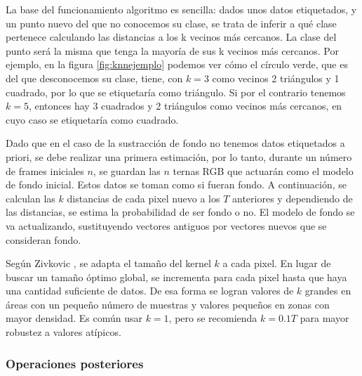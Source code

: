 La base del funcionamiento algoritmo es sencilla: dados unos datos etiquetados, y un punto nuevo del que no conocemos su clase, se trata de inferir a qué clase pertenece calculando las distancias a los k vecinos más cercanos. La clase del punto será la misma que tenga la mayoría de sus k vecinos más cercanos. Por ejemplo, en la figura \ref{fig:knnejemplo} podemos ver cómo el círculo verde, que es del que desconocemos su clase, tiene, con $k=3$ como vecinos 2 triángulos y 1 cuadrado, por lo que se etiquetaría como triángulo. Si por el contrario tenemos $k=5$, entonces hay 3 cuadrados y 2 triángulos como vecinos más cercanos, en cuyo caso se etiquetaría como cuadrado.

Dado que en el caso de la sustracción de fondo no tenemos datos etiquetados a priori, se debe realizar una primera estimación, por lo tanto, durante un número de frames iniciales $n$, se guardan las $n$ ternas RGB que actuarán como el modelo de fondo inicial. Estos datos se toman como si fueran fondo. A continuación, se calculan las $k$ distancias de cada pixel nuevo a los $T$ anteriores y dependiendo de las distancias, se estima la probabilidad de ser fondo o no. El modelo de fondo se va actualizando, sustituyendo vectores antiguos por vectores nuevos que se consideran fondo.

Según Zivkovic \cite{art:Zivkovic2}, se adapta el tamaño del kernel $k$ a cada pixel. En lugar de buscar un tamaño óptimo global, se incrementa para cada pixel hasta que haya una cantidad suficiente de datos. De esa forma se logran valores de $k$ grandes en áreas con un pequeño número de muestras y valores pequeños en zonas con mayor densidad. Es común usar $k=1$, pero se recomienda $k=0.1T$ para mayor robustez a valores atípicos.

\subsubsection*{Operaciones posteriores}

